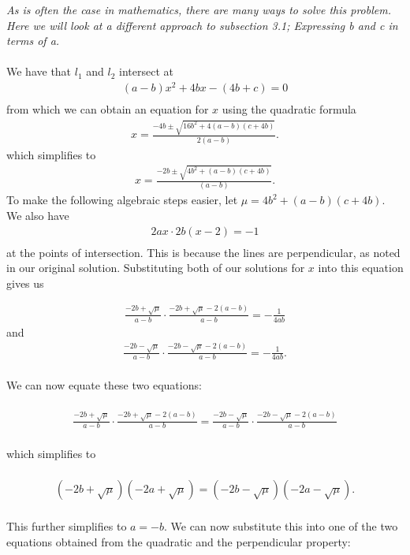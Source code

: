 \documentclass[a4paper,11pt]{article}
\theoremstyle{definition}
\begin{document}
\textit{As is often the case in mathematics, there are many ways to solve this problem. Here we will look at a different approach to subsection 3.1; Expressing b and c in terms of a.}\\
\\We have that \textit{$l_1$} and \textit{$l_2$} intersect at
\begin{align*}
    (a-b)x^2+4bx-(4b+c)=0\\
\end{align*}
from which we can obtain an equation for $x$ using the quadratic formula
\\
\begin{align*}
    x = \frac{-4b \pm \sqrt{16b^2 + 4(a-b)(c+4b)}}{2(a-b)}.
\end{align*}
which simplifies to
\begin{align*}
    x = \frac{-2b \pm \sqrt{4b^2 + (a-b)(c+4b)}}{(a-b)}.
\end{align*}To make the following algebraic steps easier, let $\mu = 4b^2 + (a-b)(c+4b)$. We also have
\begin{align*}
    2ax\cdot2b(x-2)=-1\\
\end{align*}
at the points of intersection. This is because the lines are perpendicular, as noted in our original solution.  
Substituting both of our solutions for $x$ into this equation gives us

\begin{align}
    \nonumber\frac{-2b+\sqrt{\mu}}{a-b}\cdot\frac{-2b+\sqrt{\mu}-2(a-b)}{a-b}=-\frac{1}{4ab}
\end{align}
and
\begin{align}
    \nonumber\frac{-2b-\sqrt{\mu}}{a-b}\cdot\frac{-2b-\sqrt{\mu}-2(a-b)}{a-b}=-\frac{1}{4ab}.
\end{align}
\\
We can now equate these two equations:
\\
\\
\begin{align}
    \nonumber\frac{-2b+\sqrt{\mu}}{a-b}\cdot\frac{-2b+\sqrt{\mu}-2(a-b)}{a-b}=\frac{-2b-\sqrt{\mu}}{a-b}\cdot\frac{-2b-\sqrt{\mu}-2(a-b)}{a-b}
\end{align}
\\which simplifies to
\\
\\
\begin{align*}
    \left(-2b+\sqrt{\mu}\right)\left(-2a+\sqrt{\mu}\right)=\left(-2b-\sqrt{\mu}\right)\left(-2a-\sqrt{\mu}\right).
\end{align*}
\\
This further simplifies to $a=-b$. We can now substitute this into one of the two equations obtained from the quadratic and the perpendicular property:
\end{document}
